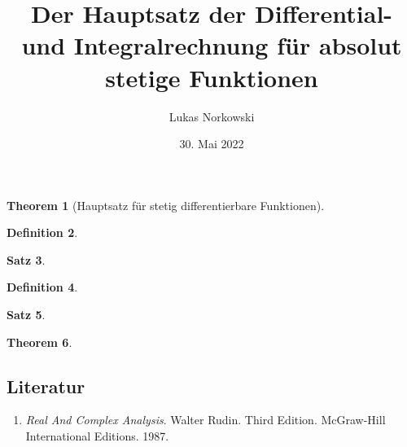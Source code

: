 \documentclass[a4paper, ngerman]{article}
\title{Der Hauptsatz der Differential- und Integralrechnung für absolut stetige Funktionen}
\author{Lukas Norkowski}
\date{30. Mai 2022}
\theoremstyle{mytheorem}
\newtheorem{theorem}{Theorem}
\newtheorem{satz}[theorem]{Satz}
\theoremstyle{definition}
\newtheorem{definition}[theorem]{Definition}
\begin{document}
	\maketitle
	\thispagestyle{empty}	

\begin{theorem}[Hauptsatz für stetig differentierbare Funktionen]
	
\end{theorem}

\begin{definition}
	
\end{definition}

\begin{satz}
  
\end{satz}

\begin{definition}
  
\end{definition}

\begin{satz}
  
\end{satz}

\begin{theorem}
  
\end{theorem}

\subsection*{Literatur}
\begin{enumerate}
	\item \emph{Real And Complex Analysis}. Walter Rudin. Third Edition. McGraw-Hill International Editions. 1987.
\end{enumerate}
\end{document}
